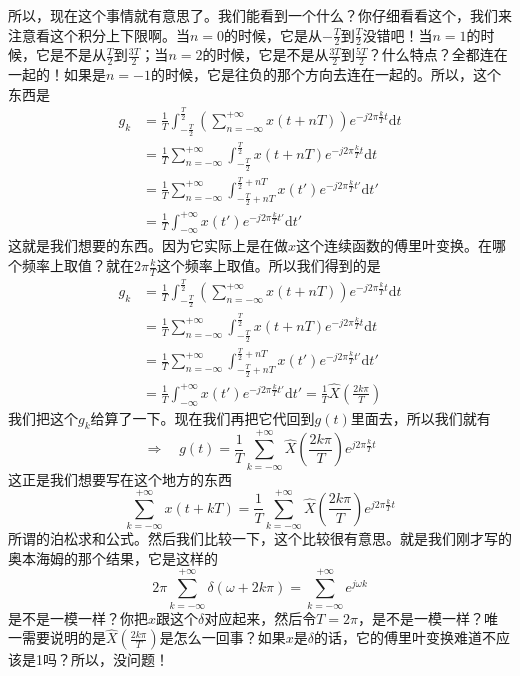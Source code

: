 \documentclass[a4paper,12pt]{article}
\begin{document}
所以，现在这个事情就有意思了。我们能看到一个什么？你仔细看看这个，我们来注意看这个积分上下限啊。当$n=0$的时候，它是从$-\frac{T}{2}$到$\frac{T}{2}$没错吧！当$n=1$的时候，它是不是从$\frac{T}{2}$到$\frac{3T}{2}$；当$n=2$的时候，它是不是从$\frac{3T}{2}$到$\frac{5T}{2}$？什么特点？全都连在一起的！如果是$n=-1$的时候，它是往负的那个方向去连在一起的。所以，这个东西是
\begin{equation}
\begin{aligned}
   g_k &= \frac{1}{T}\int_{-\frac{T}{2}}^{\frac{T}{2}}\left ( \sum_{n=-\infty}^{+\infty}x(t+nT)\right ) e^{-j2\pi \frac{k}{T}t}\text{d}t\\
&= \frac{1}{T}\sum_{n=-\infty}^{+\infty}\int_{-\frac{T}{2}}^{\frac{T}{2}}x(t+nT)e^{-j2\pi \frac{k}{T}t}\text{d}t\\
&= \frac{1}{T}\sum_{n=-\infty}^{+\infty}\int_{-\frac{T}{2}+nT}^{\frac{T}{2}+nT}x(t')e^{-j2\pi \frac{k}{T}t'}\text{d}t'\\
&= \frac{1}{T}\int_{-\infty}^{+\infty}x(t')e^{-j2\pi \frac{k}{T}t'}\text{d}t'
\end{aligned}
\end{equation}
这就是我们想要的东西。因为它实际上是在做$x$这个连续函数的傅里叶变换。在哪个频率上取值？就在$2\pi \frac{k}{T}$这个频率上取值。所以我们得到的是
\begin{equation}
\begin{aligned}
   g_k &= \frac{1}{T}\int_{-\frac{T}{2}}^{\frac{T}{2}}\left ( \sum_{n=-\infty}^{+\infty}x(t+nT)\right ) e^{-j2\pi \frac{k}{T}t}\text{d}t\\
&= \frac{1}{T}\sum_{n=-\infty}^{+\infty}\int_{-\frac{T}{2}}^{\frac{T}{2}}x(t+nT)e^{-j2\pi \frac{k}{T}t}\text{d}t\\
&= \frac{1}{T}\sum_{n=-\infty}^{+\infty}\int_{-\frac{T}{2}+nT}^{\frac{T}{2}+nT}x(t')e^{-j2\pi \frac{k}{T}t'}\text{d}t'\\
&= \frac{1}{T}\int_{-\infty}^{+\infty}x(t')e^{-j2\pi \frac{k}{T}t'}\text{d}t'=\frac{1}{T}\hat{X}\left( \frac{2k\pi}{T}  \right )
\end{aligned}
\end{equation}
我们把这个$g_k$给算了一下。现在我们再把它代回到$g(t)$里面去，所以我们就有
\begin{equation}
   \Longrightarrow \quad g(t)= \frac{1}{T}\sum_{k=-\infty}^{+\infty}\hat{X}\left( \frac{2k\pi}{T}  \right )e^{j2\pi \frac{k}{T}t}
\end{equation}
这正是我们想要写在这个地方的东西
\begin{equation}
    \sum_{k=-\infty}^{+\infty}x(t+kT) = \frac{1}{T}\sum_{k=-\infty}^{+\infty}\hat{X}\left( \frac{2k\pi}{T}  \right )e^{j2\pi \frac{k}{T}t}
\end{equation}
所谓的泊松求和公式。然后我们比较一下，这个比较很有意思。就是我们刚才写的奥本海姆的那个结果，它是这样的
\begin{equation}
   2\pi \sum_{k=-\infty}^{+\infty}\delta\left( \omega+2k \pi \right) =\sum_{k=-\infty}^{+\infty} e^{j\omega k}
\end{equation}
是不是一模一样？你把$x$跟这个$\delta$对应起来，然后令$T=2\pi$，是不是一模一样？唯一需要说明的是$\hat{X}\left( \frac{2k\pi}{T}  \right )$是怎么一回事？如果$x$是$\delta$的话，它的傅里叶变换难道不应该是1吗？所以，没问题！
\end{document}

